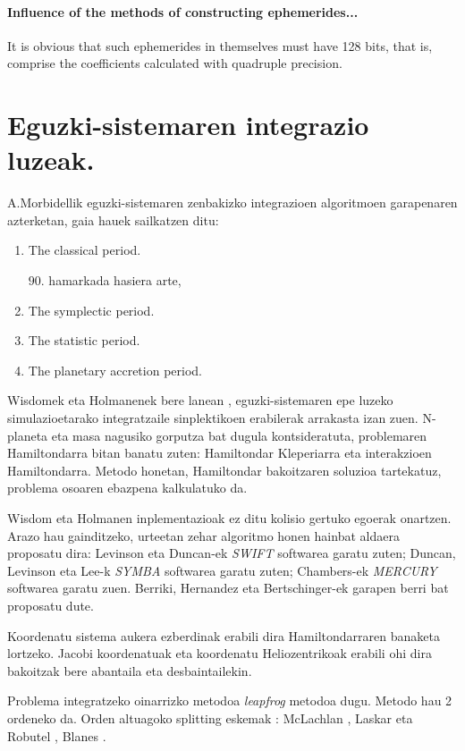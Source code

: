 \paragraph{Influence of the methods of constructing ephemerides...}
It is obvious that such ephemerides in themselves must have 128 bits, that is, comprise the coefficients calculated with quadruple precision.


\section{Eguzki-sistemaren integrazio luzeak.}

A.Morbidellik \cite{Morbidelli2002} eguzki-sistemaren zenbakizko integrazioen algoritmoen garapenaren azterketan, gaia hauek sailkatzen ditu:

\begin{enumerate}

\item The classical period.

$90$. hamarkada hasiera arte,  

\item The symplectic period.

\item The statistic period.

\item The planetary accretion period. 

\end{enumerate}


Wisdomek eta Holmanenek bere lanean ,  eguzki-sistemaren epe luzeko simulazioetarako integratzaile  sinplektikoen erabilerak arrakasta izan zuen. N-planeta eta masa nagusiko gorputza bat dugula kontsideratuta, problemaren Hamiltondarra bitan banatu zuten:  Hamiltondar Kleperiarra eta interakzioen Hamiltondarra. Metodo honetan, Hamiltondar bakoitzaren soluzioa tartekatuz, problema osoaren ebazpena kalkulatuko da. 

Wisdom eta Holmanen inplementazioak ez ditu kolisio gertuko egoerak onartzen. Arazo hau gainditzeko, urteetan zehar algoritmo honen hainbat aldaera proposatu dira: Levinson eta Duncan-ek   \emph{SWIFT} softwarea garatu zuten;  Duncan, Levinson eta Lee-k  \emph{SYMBA} softwarea garatu zuten; Chambers-ek \cite{Chambers1999} \emph{MERCURY} softwarea garatu zuen. Berriki, Hernandez eta Bertschinger-ek  garapen berri bat proposatu dute.

Koordenatu sistema aukera ezberdinak erabili dira Hamiltondarraren banaketa lortzeko. Jacobi koordenatuak eta koordenatu Heliozentrikoak erabili ohi dira bakoitzak bere abantaila eta desbaintailekin.

Problema integratzeko oinarrizko metodoa \emph{leapfrog} metodoa dugu. Metodo hau 2 ordeneko da. Orden altuagoko splitting eskemak : McLachlan , Laskar eta Robutel \cite[2001]{Laskar2001}, Blanes \cite{Blanes2013}.

   
       
